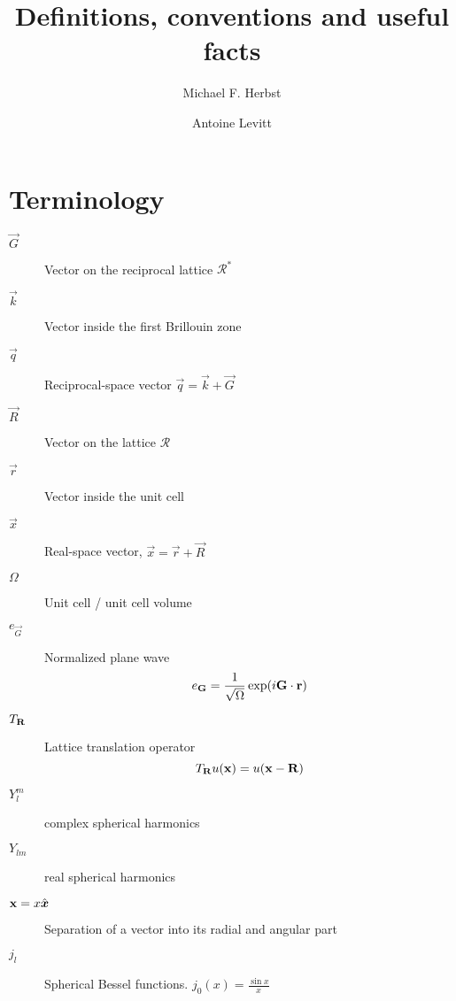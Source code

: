 \documentclass[a4paper]{article}
\begin{document}
\title{Definitions, conventions and useful facts}
\author{Michael F. Herbst \and Antoine Levitt}
\maketitle

\section{Terminology}
\begin{description}
\item[$\vec{G}$] Vector on the reciprocal lattice $\mathcal{R}^\ast$
\item[$\vec{k}$] Vector inside the first Brillouin zone
\item[$\vec{q}$] Reciprocal-space vector $\vec{q} = \vec{k} + \vec{G}$
\item[$\vec{R}$] Vector on the lattice $\mathcal{R}$
\item[$\vec{r}$] Vector inside the unit cell
\item[$\vec{x}$] Real-space vector, $\vec{x} = \vec{r} + \vec{R}$
\item[$\Omega$] Unit cell / unit cell volume
\item[$e_{\vec{G}}$] Normalized plane wave
  \[ e_{\mathbf{G}} = \frac1{\sqrt{\Omega}} \exp(i \mathbf{G} \cdot \mathbf{r})\]
\item[$T_{\mathbf{R}}$] Lattice translation operator
  \[ T_{\mathbf{R}} u(\mathbf{x}) = u(\mathbf{x} -
    \mathbf{R}) \]
\item[$Y_l^m$] complex spherical harmonics
\item[$Y_{lm}$] real spherical harmonics
\item[$\mathbf{x} = x \hat{{\boldsymbol{x}}}$] Separation of a vector into its radial and
  angular part
\item[$j_{l}$] Spherical Bessel functions. $j_{0}(x) = \frac{\sin x}{x}$
\end{description}
\end{document}
